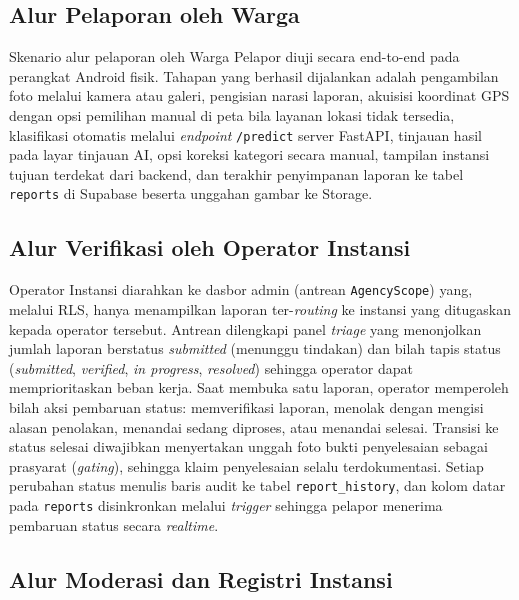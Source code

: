 \subsection{Alur Pelaporan oleh Warga}

Skenario alur pelaporan oleh Warga Pelapor diuji secara end-to-end pada perangkat Android fisik. Tahapan yang berhasil dijalankan adalah pengambilan foto melalui kamera atau galeri, pengisian narasi laporan, akuisisi koordinat GPS dengan opsi pemilihan manual di peta bila layanan lokasi tidak tersedia, klasifikasi otomatis melalui \textit{endpoint} \texttt{/predict} server FastAPI, tinjauan hasil pada layar tinjauan AI, opsi koreksi kategori secara manual, tampilan instansi tujuan terdekat dari backend, dan terakhir penyimpanan laporan ke tabel \texttt{reports} di Supabase beserta unggahan gambar ke Storage.

\subsection{Alur Verifikasi oleh Operator Instansi}

Operator Instansi diarahkan ke dasbor admin (antrean \texttt{AgencyScope}) yang, melalui RLS, hanya menampilkan laporan ter-\textit{routing} ke instansi yang ditugaskan kepada operator tersebut. Antrean dilengkapi panel \textit{triage} yang menonjolkan jumlah laporan berstatus \textit{submitted} (menunggu tindakan) dan bilah tapis status (\textit{submitted}, \textit{verified}, \textit{in progress}, \textit{resolved}) sehingga operator dapat memprioritaskan beban kerja. Saat membuka satu laporan, operator memperoleh bilah aksi pembaruan status: memverifikasi laporan, menolak dengan mengisi alasan penolakan, menandai sedang diproses, atau menandai selesai. Transisi ke status selesai diwajibkan menyertakan unggah foto bukti penyelesaian sebagai prasyarat (\textit{gating}), sehingga klaim penyelesaian selalu terdokumentasi. Setiap perubahan status menulis baris audit ke tabel \texttt{report\_history}, dan kolom datar pada \texttt{reports} disinkronkan melalui \textit{trigger} sehingga pelapor menerima pembaruan status secara \textit{realtime}.

\subsection{Alur Moderasi dan Registri Instansi}

